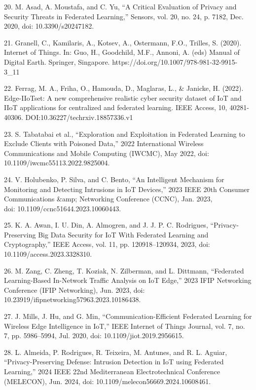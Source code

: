 \begin{noparindent}
20. M. Asad, A. Moustafa, and C. Yu, ``A Critical Evaluation of Privacy
and Security Threats in Federated Learning,'' Sensors, vol. 20, no. 24,
p. 7182, Dec. 2020, doi: 10.3390/s20247182.

21. Granell, C., Kamilaris, A., Kotsev, A., Ostermann, F.O., Trilles, S.
(2020). Internet of Things. In: Guo, H., Goodchild, M.F., Annoni, A.
(eds) Manual of Digital Earth. Springer, Singapore.
https://doi.org/10.1007/978-981-32-9915-3\_11

22. Ferrag, M. A., Friha, O., Hamouda, D., Maglaras, L., \& Janicke, H.
(2022). Edge-IIoTset: A new comprehensive realistic cyber security
dataset of IoT and IIoT applications for centralized and federated
learning. IEEE Access, 10, 40281-40306.
DOI:10.36227/techrxiv.18857336.v1

23. S. Tabatabai et al., ``Exploration and Exploitation in Federated
Learning to Exclude Clients with Poisoned Data,'' 2022 International
Wireless Communications and Mobile Computing (IWCMC), May 2022, doi:
10.1109/iwcmc55113.2022.9825004.

24. V. Holubenko, P. Silva, and C. Bento, ``An Intelligent Mechanism for
Monitoring and Detecting Intrusions in IoT Devices,'' 2023 IEEE 20th
Consumer Communications \&amp; Networking Conference (CCNC), Jan. 2023,
\\doi: 10.1109/ccnc51644.2023.10060443.

25. K. A. Awan, I. U. Din, A. Almogren, and J. J. P. C. Rodrigues,
``Privacy-Preserving Big Data Security for IoT With Federated Learning
and Cryptography,'' IEEE Access, vol. 11, pp. 120918--120934, 2023, doi:
10.1109/access.2023.3328310.

26. M. Zang, C. Zheng, T. Koziak, N. Zilberman, and L. Dittmann,
``Federated Learning-Based In-Network Traffic Analysis on IoT Edge,''
2023 IFIP Networking Conference (IFIP Networking), Jun. 2023, doi:
10.23919/ifipnetworking57963.2023.10186438.

27. J. Mills, J. Hu, and G. Min, ``Communication-Efficient Federated
Learning for Wireless Edge Intelligence in IoT,'' IEEE Internet of
Things Journal, vol. 7, no. 7, pp. 5986--5994, Jul. 2020, doi:
10.1109/jiot.2019.2956615.

28. L. Almeida, P. Rodrigues, R. Teixeira, M. Antunes, and R. L. Aguiar,
``Privacy-Preserving Defense: Intrusion Detection in IoT using Federated
Learning,'' 2024 IEEE 22nd Mediterranean Electrotechnical Conference
(MELECON), Jun. 2024, doi: 10.1109/melecon56669.2024.10608461.


\end{noparindent}
